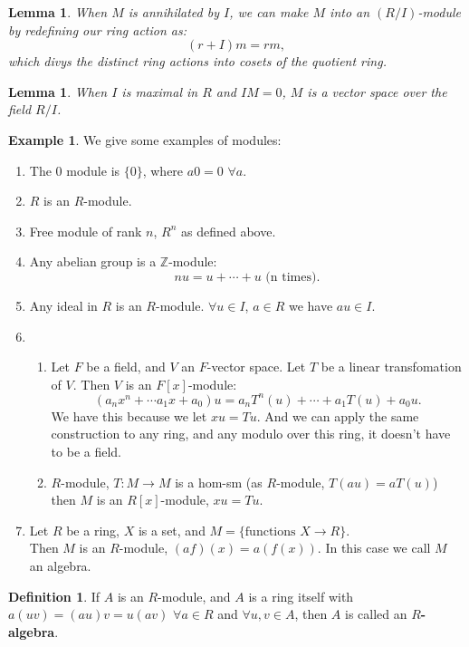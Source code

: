 \documentclass[12pt]{amsbook}
\theoremstyle{plain}
\numberwithin{section}{chapter}
\numberwithin{equation}{chapter}
\newtheorem{lem}[theorem]{Lemma}
\theoremstyle{definition}
\newtheorem{Def}[theorem]{Definition}
\newtheorem{Ex}[theorem]{Example}
\theoremstyle{remark}
\begin{document}
\begin{lem}
When $M$ is annihilated by $I$, we can make $M$ into an $(R/I)$-module by redefining our ring action as:
$$
(r + I)m = rm,
$$
which divys the distinct ring actions into cosets of the quotient ring. 
\end{lem}

\begin{lem}
When $I$ is maximal in $R$ and $IM = 0$, $M$ is a vector space over the field $R/I$. 
\end{lem}

\begin{Ex}
We give some examples of modules:
\begin{enumerate}
\item The $0$ module is $\{0\}$, where $a0 = 0$ $\forall a$. 
\item $R$ is an $R$-module. 

\item Free module of rank $n$, $R^n$ as defined above. 
\item Any abelian group is a $\mathbb{Z}$-module:
$$
nu = u + \cdots + u\text{ (n times)}. 
$$
\item Any ideal in $R$ is an $R$-module. $\forall u \in I$, $a \in R$ we have $au \in I$. 

\item 

\begin{enumerate}
\item Let $F$ be a field, and $V$ an $F$-vector space. Let $T$ be a linear transfomation of $V$. Then $V$ is an $F[x]$-module:
$$
(a_nx^n + \cdots a_1x + a_0)u = a_nT^n(u) + \cdots + a_1T(u) + a_0u. 
$$
We have this because we let $xu = Tu$. And we can apply the same construction to any ring, and any modulo over this ring, it doesn't have to be a field. 
\item $R$-module, $T:M \to M$ is a hom-sm (as $R$-module, $T(au) = aT(u)$) then $M$ is an $R[x]$-module, $xu = Tu$. 
\end{enumerate}
\item Let $R$ be a ring, $X$ is a set, and $M = \{\text{functions } X\to R\}$. \\
Then $M$ is an $R$-module, $(af)(x) = a(f(x))$. In this case we call $M$ an algebra. 
\end{enumerate}
\end{Ex}

\begin{Def}
If $A$ is an $R$-module, and $A$ is a ring itself with $a(uv) = (au)v = u(av)$ $\forall a \in R$ and $\forall u,v \in A$, then $A$ is called an $R$\textbf{-algebra}. 
\end{Def}
\end{document}
